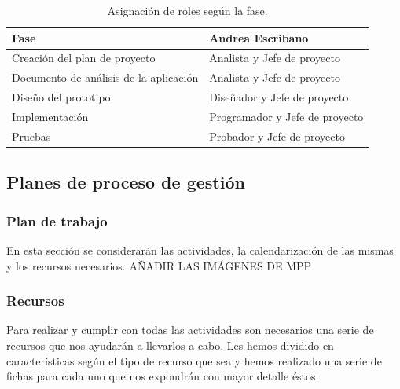 \documentclass[a4paper,11pt, twoside]{article}
\begin{document}
\begin{table}[!htbp]
\hspace*{1cm}
\centering
\begin{tabular}{|M{7cm}|M{6.5cm}|}
 \hline
 Fase & Andrea Escribano \\
 \hline
 Creación del plan de proyecto & Analista y Jefe de proyecto  \\
 \hline
 Documento de análisis de la aplicación & Analista y Jefe de proyecto \\
 \hline
 Diseño del prototipo & Diseñador y Jefe de proyecto \\
 \hline
 Implementación & Programador y Jefe de proyecto \\
 \hline
 Pruebas &  Probador y Jefe de proyecto\\
 \hline
\end{tabular}
\caption{Asignación de roles según la fase.}
\label{ta:roles}
\end{table}
\subsection{Planes de proceso de gestión}
\subsubsection{Plan de trabajo}
En esta sección se considerarán las actividades, la calendarización de las mismas y los recursos necesarios.
{\color{red} AÑADIR LAS IMÁGENES DE MPP }
\subsubsection{Recursos}
Para realizar y cumplir con todas las actividades son necesarios una serie de recursos que nos ayudarán a llevarlos a cabo. Les hemos dividido en características según el tipo de recurso que sea y hemos realizado una serie de fichas para cada uno que nos expondrán con mayor detalle éstos.
\end{document}
